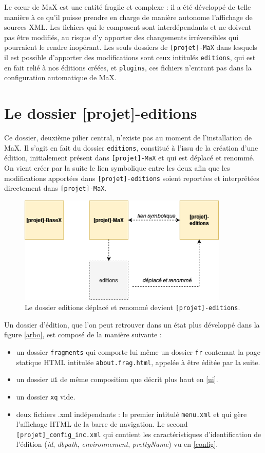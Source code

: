 \documentclass[a4paper,12pt,twoside]{book}
\begin{document}
Le c\oe{}ur de MaX est une entité fragile et complexe : il a été développé de telle manière à ce qu'il puisse prendre en charge de manière autonome l'affichage de sources XML. Les fichiers qui le composent sont interdépendants et ne doivent pas être modifiés, au risque d'y apporter des changements irréversibles qui pourraient le rendre inopérant. Les seuls dossiers de \texttt{[projet]-MaX} dans lesquels il est possible d'apporter des modifications sont ceux intitulés \texttt{editions}, qui est en fait relié à nos éditions créées, et  \texttt{plugins}, ces fichiers n'entrant pas dans la configuration automatique de MaX.

\section{Le dossier [projet]-editions}
Ce dossier, deuxième pilier central, n'existe pas au moment de l'installation de MaX. Il s'agit en fait du dossier \texttt{editions}, constitué à l'issu de la création d'une édition, initialement présent dans \texttt{[projet]-MaX} et qui est déplacé et renommé. On vient créer par la suite le lien symbolique entre les deux afin que les modifications apportées dans \texttt{[projet]-editions} soient reportées et interprétées directement dans \texttt{[projet]-MaX}.

\begin{figure}[H]
    \centering
    \includegraphics[width=10cm]{img/partie_2/editions.png}
    \caption{Le dossier editions déplacé et renommé devient \texttt{[projet]-editions}.}
\end{figure}

Un dossier d'édition, que l'on peut retrouver dans un état plus développé dans la figure \ref{arbo}, est composé de la manière suivante :
\begin{itemize}
    \item un dossier \texttt{fragments} qui comporte lui même un dossier \texttt{fr} contenant la page statique \acrshort{HTML} intitulée \texttt{about.frag.html}, appelée à être éditée par la suite.
    \item un dossier \texttt{ui} de même composition que décrit plus haut en \ref{ui}.
    \item un dossier \texttt{xq} vide.
    \item deux fichiers .xml indépendants : le premier intitulé \texttt{menu.xml} et qui gère l'affichage \acrshort{HTML} de la barre de navigation. Le second   \texttt{[projet]\_config\_inc.xml} qui contient les caractéristiques d'identification de l'édition (\textit{id}, \textit{dbpath}, \textit{environnement}, \textit{prettyName}) vu en \ref{config}.
\end{itemize}
\end{document}
